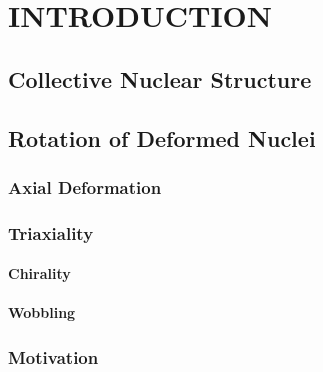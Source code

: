 %
%

\chapter{INTRODUCTION}
\label{chp:intro}

\section{Collective Nuclear Structure}
\label{sec:intro-coll-ns}

\section{Rotation of Deformed Nuclei}
\label{sec:intro-rot-def-nuc}

\subsection{Axial Deformation}
\label{ssec:intro-rot-axial-def}

\subsection{Triaxiality}
\label{ssec:intro-rot-triax}

\subsubsection{Chirality}
\label{sssec:intro-rot-chiral}

\subsubsection{Wobbling}
\label{sssec:intro-rot-wob}

\subsection{Motivation}
\label{ssec:intro-rot-motivation}









